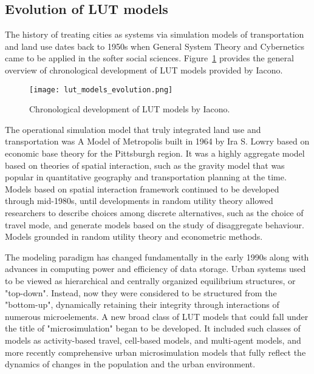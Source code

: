 \subsection{Evolution of LUT models} \label{subsec:evolution_of_lut_models}

The history of treating cities as systems via simulation models of transportation and land use dates back to 1950s when General System Theory and Cybernetics came to be applied in the softer social sciences\cite{Batty2008}.
Figure~\ref{fig:lut_model_evolution} provides the general overview of chronological development of LUT models provided by Iacono\cite{Iacono2008}.

\begin{figure}[hbt!]
    \centering
    \texttt{[image: lut\_models\_evolution.png]}
    \caption{Chronological development of LUT models by Iacono\cite{Iacono2008}.}
    \label{fig:lut_model_evolution}
\end{figure}

The operational simulation model that truly integrated land use and transportation was A Model of Metropolis built in 1964 by Ira S. Lowry based on economic base theory for the Pittsburgh region\cite{Lowry1964}.
It was a highly aggregate model based on theories of spatial interaction, such as the gravity model that was popular in quantitative geography and transportation planning at the time\cite{Bouchard1965}.
Models based on spatial interaction framework continued to be developed through mid-1980s, until developments in random utility theory allowed researchers to describe choices among discrete alternatives, such as the choice of travel mode, and generate models based on the study of disaggregate behaviour.
Models grounded in random utility theory and econometric methods\cite{Iacono2008}.

The modeling paradigm has changed fundamentally in the early 1990s along with advances in computing power and efficiency of data storage.
Urban systems used to be viewed as hierarchical and centrally organized equilibrium structures, or "top-down".
Instead, now they were considered to be structured from the "bottom-up", dynamically retaining their integrity through interactions of numerous microelements\cite{Batty2008}.
A new broad class of LUT models that could fall under the title of "microsimulation" began to be developed.
It included such classes of models as activity-based travel, cell-based models, and multi-agent models, and more recently comprehensive urban microsimulation models that fully reflect the dynamics of changes in the population and the urban environment\cite{Iacono2008}.



